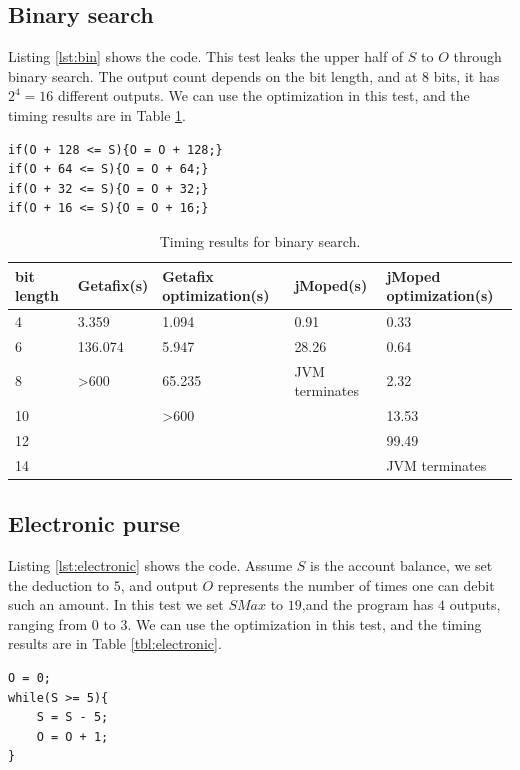 \subsection{Binary search}
Listing \ref{lst:bin} shows the code. This test leaks the upper half of $S$ to $O$ through binary search. The output count depends on the bit length, and at $8$ bits, it has $2^{4} = 16$ different outputs. We can use the optimization in this test, and the timing results are in Table \ref{tbl:bin}.

\lstset{language=C} 
\begin{lstlisting}[float=!h, caption={Binary search test program at 8 bits.},label=lst:bin]
if(O + 128 <= S){O = O + 128;}
if(O + 64 <= S){O = O + 64;}
if(O + 32 <= S){O = O + 32;}
if(O + 16 <= S){O = O + 16;}
\end{lstlisting}

\begin{table}[!h]
\begin{center}
\begin{tabular}{|l|l|l|l|l|}
\hline
bit length & Getafix(s) & Getafix optimization(s) & jMoped(s) & jMoped optimization(s) \\ \hline
4 & 3.359 & 1.094 & 0.91 & 0.33 \\ \hline
6 & 136.074 & 5.947 & 28.26 & 0.64 \\ \hline
8 & \textgreater600 & 65.235 & JVM terminates & 2.32 \\ \hline
10 &  & \textgreater600 &  & 13.53 \\ \hline
12 &  &  &  & 99.49 \\ \hline
14 &  &  &  & JVM terminates \\ \hline
\end{tabular}
\end{center}
\caption{Timing results for binary search.}
\label{tbl:bin}
\end{table}

\subsection{Electronic purse}
Listing \ref{lst:electronic} shows the code. Assume $S$ is the account balance, we set the deduction to $5$, and output $O$ represents the number of times one can debit such an amount.  In this test we set $SMax$ to $19$,and the program has $4$ outputs, ranging from $0$ to $3$. We can use the optimization in this test, and the timing results are in Table \ref{tbl:electronic}.

\lstset{language=C}  
\begin{lstlisting}[float=!h, caption={Electronic purse test program.},label=lst:electronic]
O = 0;
while(S >= 5){
	S = S - 5;
	O = O + 1;
}
\end{lstlisting}


